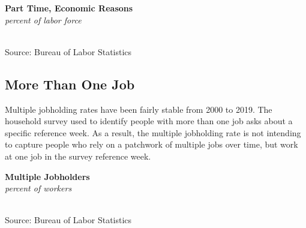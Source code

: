 \documentclass{report}
\makeatletter
\newcommand{\tbllink}[1]{\href{https://raw.githubusercontent.com/bdecon/US-chartbook/master/chartbook/data/#1}{\faTable}}
\newcommand*\short[1]{\expandafter\@gobbletwo\number\numexpr#1\relax}
\newcommand{\shdateaxisticks}{
		date coordinates in=x, axis line style={draw=none},
		xmax={2021-06-15},
		max space between ticks=40,	    
		xtick={{1990-01-01}, {1995-01-01}, {2000-01-01}, 
			{2005-01-01}, {2010-01-01}, {2015-01-01}, {2020-01-01}},
		minor xtick={},
		enlarge y limits={0.06}, enlarge x limits={0.01},
		}
\newcommand{\stdline}[4]{\addplot[very thick, no markers, color=#1] 
		table [x=#2, y=#3, col sep=comma] {#4};	}
\newcommand{\thinline}[4]{\addplot[no markers, color=#1] 
		table [x=#2, y=#3, col sep=comma] {#4};	}
\newcommand{\rbars}{
		\fill[color=black!10] (axis cs:{1990-07-01},\pgfkeysvalueof{/pgfplots/ymin}) rectangle 
			(axis cs:{1991-03-01}, \pgfkeysvalueof{/pgfplots/ymax});
		\fill[color=black!10] (axis cs:{2007-12-01},\pgfkeysvalueof{/pgfplots/ymin}) rectangle 
			(axis cs:{2009-07-01}, \pgfkeysvalueof{/pgfplots/ymax});
		\fill[color=black!10] (axis cs:{2001-03-01},\pgfkeysvalueof{/pgfplots/ymin}) rectangle 
			(axis cs:{2001-11-01}, \pgfkeysvalueof{/pgfplots/ymax});
		\fill[color=black!10] (axis cs:{2020-02-01},\pgfkeysvalueof{/pgfplots/ymin}) rectangle 
			(axis cs:{2021-06-15}, \pgfkeysvalueof{/pgfplots/ymax});}
\newcommand{\rebars}{
		\fill[color=black!10] (axis cs:{2007-12-01},\pgfkeysvalueof{/pgfplots/ymin}) rectangle 
			(axis cs:{2009-07-01}, \pgfkeysvalueof{/pgfplots/ymax});
		\fill[color=black!10] (axis cs:{2001-03-01},\pgfkeysvalueof{/pgfplots/ymin}) rectangle 
			(axis cs:{2001-11-01}, \pgfkeysvalueof{/pgfplots/ymax});
		\fill[color=black!10] (axis cs:{2020-02-01},\pgfkeysvalueof{/pgfplots/ymin}) rectangle 
			(axis cs:{2021-06-15}, \pgfkeysvalueof{/pgfplots/ymax});}
\makeatother
\begin{document}
{{\begin{minipage}{0.408\textwidth}
\normalsize \textbf{Part Time, Economic Reasons}\\
\footnotesize{\textit{percent of labor force}}\\
\hspace*{-2mm} \\
\footnotesize{Source: Bureau of Labor Statistics} \hfill \tbllink{ptecon.csv} 
\end{minipage}
\hspace{5mm}
\begin{minipage}{0.31\textwidth}
\small 
\end{minipage}
\vspace{6mm}

\begin{minipage}{0.76\textwidth}
\subsection*{\color{black!70} \seriffont More Than One Job}
\small Multiple jobholding rates have been fairly stable from 2000 to 2019. The household survey used to identify people with more than one job asks about a specific reference week. As a result, the multiple jobholding rate is not intending to capture people who rely on a patchwork of multiple jobs over time, but work at one job in the survey reference week. 
\end{minipage}

\begin{minipage}{0.43\textwidth}
\normalsize \textbf{Multiple Jobholders}\\
\footnotesize{\textit{percent of workers}}\\
\hspace*{-2mm} \\
\footnotesize{Source: Bureau of Labor Statistics} \hfill \tbllink{mjh.csv} 
\end{minipage}
\hspace{7mm}
\begin{minipage}{0.28\textwidth}
\small 
\end{minipage}
\newpage
\begin{minipage}{0.76\textwidth}

\end{minipage}}}
\end{document}
